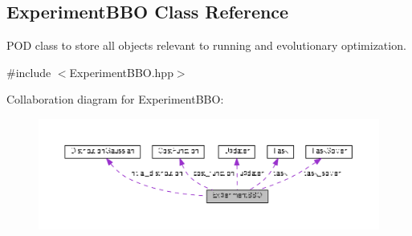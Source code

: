 \hypertarget{classDmpBbo_1_1ExperimentBBO}{\subsection{Experiment\+B\+B\+O Class Reference}
\label{classDmpBbo_1_1ExperimentBBO}
}


P\+O\+D class to store all objects relevant to running and evolutionary optimization.  




{\ttfamily \#include $<$Experiment\+B\+B\+O.\+hpp$>$}



Collaboration diagram for Experiment\+B\+B\+O\+:
\nopagebreak
\begin{figure}[H]
\begin{center}
\leavevmode
\includegraphics[width=350pt]{classDmpBbo_1_1ExperimentBBO__coll__graph}
\end{center}
\end{figure}
